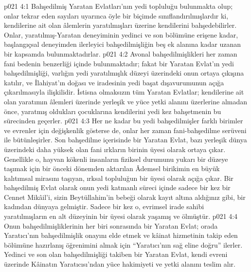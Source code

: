 \vs p021 4:1 Bahşedilmiş Yaratan Evlatları’nın yedi topluluğu bulunmakta olup; onlar tekrar eden sayıları uyarınca öyle bir biçimde sınıflandırılmışlardır ki, kendilerine ait olan âlemlerin yaratılmışları üzerine kendilerini bahşedebilirler. Onlar, yaratılmış\hyp{}Yaratan deneyiminin yedinci ve son bölümüne erişene kadar, başlangıçsal deneyimden ilerleyici bahşedilmişliğin beş ek alanına kadar uzanan bir kapsamda bulunmaktadırlar.
\vs p021 4:2 Avonal bahşedilmişlikleri her zaman fani bedenin benzerliği içinde bulunmaktadır; fakat bir Yaratan Evlat’ın yedi bahşedilmişliği, varlığın yedi yaratılmışlık düzeyi üzerindeki onun ortaya çıkışına katılır, ve İlahiyat’ın doğası ve iradesinin yedi başat dışavurumunun açığa çıkarılmasıyla ilişkilidir. İstisna olmaksızın tüm Yaratan Evlatlar; kendilerine ait olan yaratımın âlemleri üzerinde yerleşik ve yüce yetki alanını üzerlerine almadan önce, yaratmış oldukları çocuklarına kendilerini yedi kez bahşetmenin bu sürecinden geçerler.
\vs p021 4:3 Her ne kadar bu yedi bahşedilmişler farklı birimler ve evrenler için değişkenlik gösterse de, onlar her zaman fani\hyp{}bahşedilme serüveni ile bütünleşirler. Son bahşedilme içerisinde bir Yaratan Evlat, bazı yerleşik dünya üzerindeki daha yüksek olan fani ırkların birinin üyesi olarak ortaya çıkar. Genellikle o, hayvan kökenli insanların fiziksel durumunu yukarı bir düzeye taşımak için bir önceki dönemden aktarılan Âdemsel birikimin en büyük kalıtımsal mirasını taşıyan, ırksal topluluğun bir üyesi olarak açığa çıkar. Bir bahşedilmiş Evlat olarak onun yedi katmanlı süreci içinde sadece bir kez bir Cennet Mikâil’i, sizin Beytüllahim’in bebeği olarak kayıt altına aldığınız gibi, bir kadından dünyaya gelmiştir. Sadece bir kez o, evrimsel irade sahibi yaratılmışların en alt düzeyinin bir üyesi olarak yaşamış ve ölmüştür.
\vs p021 4:4 Onun bahşedilmişliklerinin her biri sonrasında bir Yaratan Evlat; orada Yaratıcı’nın bahşedilmişlik onayını elde etmek ve kâinat hizmetinin takip eden bölümüne hazırlanış öğrenimini almak için “Yaratıcı’nın sağ eline doğru” ilerler. Yedinci ve son olan bahşedilmişliği takiben bir Yaratan Evlat, kendi evreni üzerinde Kâinatın Yaratıcısı’ndan yüce hakimiyeti ve yetki alanını teslim alır.
